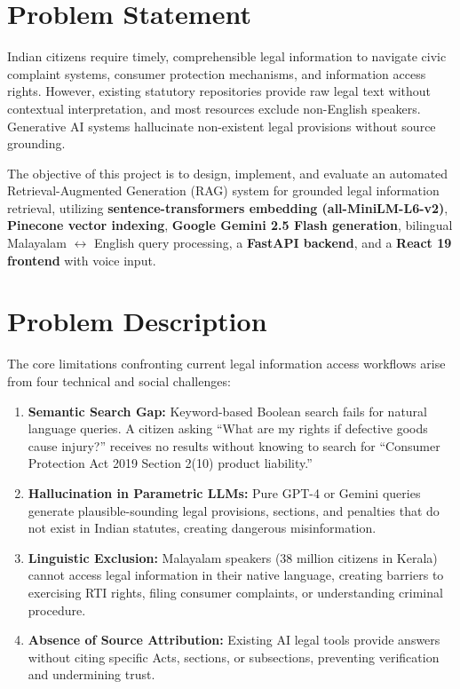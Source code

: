 \documentclass[12pt,a4paper]{report}
\begin{document}
\section{Problem Statement}
Indian citizens require timely, comprehensible legal information to navigate civic complaint systems, consumer protection mechanisms, and information access rights. However, existing statutory repositories provide raw legal text without contextual interpretation, and most resources exclude non-English speakers. Generative AI systems hallucinate non-existent legal provisions without source grounding.

The objective of this project is to design, implement, and evaluate an automated Retrieval-Augmented Generation (RAG) system for grounded legal information retrieval, utilizing \textbf{sentence-transformers embedding (all-MiniLM-L6-v2)}, \textbf{Pinecone vector indexing}, \textbf{Google Gemini 2.5 Flash generation}, bilingual Malayalam $\leftrightarrow$ English query processing, a \textbf{FastAPI backend}, and a \textbf{React 19 frontend} with voice input.

\section{Problem Description}
The core limitations confronting current legal information access workflows arise from four technical and social challenges:
\begin{enumerate}
    \item \textbf{Semantic Search Gap:} Keyword-based Boolean search fails for natural language queries. A citizen asking ``What are my rights if defective goods cause injury?'' receives no results without knowing to search for ``Consumer Protection Act 2019 Section 2(10) product liability.''
    \item \textbf{Hallucination in Parametric LLMs:} Pure GPT-4 or Gemini queries generate plausible-sounding legal provisions, sections, and penalties that do not exist in Indian statutes, creating dangerous misinformation.
    \item \textbf{Linguistic Exclusion:} Malayalam speakers (38 million citizens in Kerala) cannot access legal information in their native language, creating barriers to exercising RTI rights, filing consumer complaints, or understanding criminal procedure.
    \item \textbf{Absence of Source Attribution:} Existing AI legal tools provide answers without citing specific Acts, sections, or subsections, preventing verification and undermining trust.
\end{enumerate}
\end{document}
